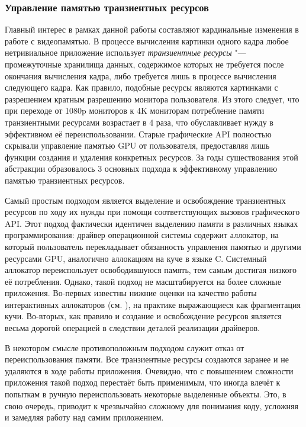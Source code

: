 \subsubsection{Управление памятью транзиентных ресурсов}
Главный интерес в рамках данной работы составляют кардинальные изменения в работе с видеопамятью.
В процессе вычисления картинки одного кадра любое нетривиальное приложение использует \textit{транзиентные ресурсы} "--- промежуточные хранилища данных, содержимое которых не требуется после окончания вычисления кадра, либо требуется лишь в процессе вычисления следующего кадра.
Как правило, подобные ресурсы являются картинками с разрешением кратным разрешению монитора пользователя.
Из этого следует, что при переходе от 1080p мониторов к 4K мониторам потребление памяти транзиентными ресурсами возрастает в 4 раза, что обуславливает нужду в эффективном её переиспользовании.
Старые графические API полностью скрывали управление памятью GPU от пользователя, предоставляя лишь функции создания и удаления конкретных ресурсов.
За годы существования этой абстракции образовалось 3 основных подхода к эффективному управлению памятью транзиентных ресурсов.

Самый простым подходом является выделение и освобождение транзиентных ресурсов по ходу их нужды при помощи соответствующих вызовов графического API.
Этот подход фактически идентичен выделению памяти в различных языках программирования: драйвер операционной системы содержит аллокатор, на который пользователь перекладывает обязанность управления памятью и другими ресурсами GPU, аналогично аллокациям на куче в языке C.
Системный аллокатор переиспользует освободившуюся память, тем самым достигая низкого её потребления.
Однако, такой подход не масштабируется на более сложные приложения.
Во-первых известны нижние оценки на качество работы интерактивных аллокаторов (см. \cite{robson1971estimate}), на практике выражающиеся как фрагментация кучи.
Во-вторых, как правило и создание и освобождение ресурсов является весьма дорогой операцией в следствии деталей реализации драйверов.

В некотором смысле противоположным подходом служит отказ от переиспользования памяти.
Все транзиентные ресурсы создаются заранее и не удаляются в ходе работы приложения.
Очевидно, что с повышением сложности приложения такой подход перестаёт быть применимым, что иногда влечёт к попыткам в ручную переиспользовать некоторые выделенные объекты.
Это, в свою очередь, приводит к чрезвычайно сложному для понимания коду, усложняя и замедляя работу над самим приложением.

